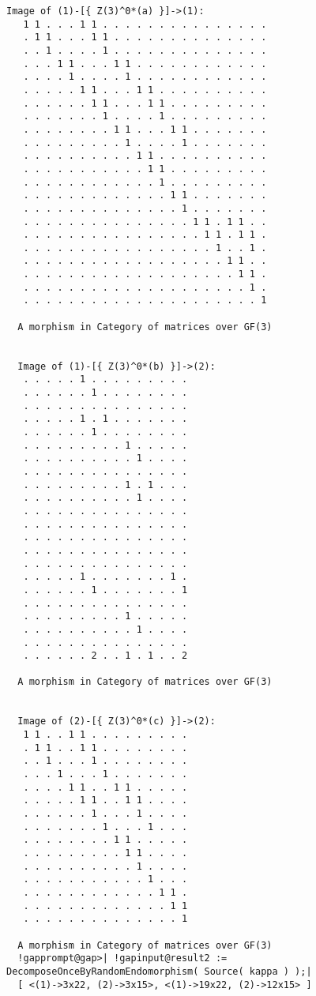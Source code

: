 \begin{computation}
\begin{Verbatim}[commandchars=!@|,fontsize=\small,frame=single,label=Example]
  Image of (1)-[{ Z(3)^0*(a) }]->(1):
   1 1 . . . 1 1 . . . . . . . . . . . . . . .
   . 1 1 . . . 1 1 . . . . . . . . . . . . . .
   . . 1 . . . . 1 . . . . . . . . . . . . . .
   . . . 1 1 . . . 1 1 . . . . . . . . . . . .
   . . . . 1 . . . . 1 . . . . . . . . . . . .
   . . . . . 1 1 . . . 1 1 . . . . . . . . . .
   . . . . . . 1 1 . . . 1 1 . . . . . . . . .
   . . . . . . . 1 . . . . 1 . . . . . . . . .
   . . . . . . . . 1 1 . . . 1 1 . . . . . . .
   . . . . . . . . . 1 . . . . 1 . . . . . . .
   . . . . . . . . . . 1 1 . . . . . . . . . .
   . . . . . . . . . . . 1 1 . . . . . . . . .
   . . . . . . . . . . . . 1 . . . . . . . . .
   . . . . . . . . . . . . . 1 1 . . . . . . .
   . . . . . . . . . . . . . . 1 . . . . . . .
   . . . . . . . . . . . . . . . 1 1 . 1 1 . .
   . . . . . . . . . . . . . . . . 1 1 . 1 1 .
   . . . . . . . . . . . . . . . . . 1 . . 1 .
   . . . . . . . . . . . . . . . . . . 1 1 . .
   . . . . . . . . . . . . . . . . . . . 1 1 .
   . . . . . . . . . . . . . . . . . . . . 1 .
   . . . . . . . . . . . . . . . . . . . . . 1
   
  A morphism in Category of matrices over GF(3)
   
   
  Image of (1)-[{ Z(3)^0*(b) }]->(2):
   . . . . . 1 . . . . . . . . .
   . . . . . . 1 . . . . . . . .
   . . . . . . . . . . . . . . .
   . . . . . 1 . 1 . . . . . . .
   . . . . . . 1 . . . . . . . .
   . . . . . . . . . 1 . . . . .
   . . . . . . . . . . 1 . . . .
   . . . . . . . . . . . . . . .
   . . . . . . . . . 1 . 1 . . .
   . . . . . . . . . . 1 . . . .
   . . . . . . . . . . . . . . .
   . . . . . . . . . . . . . . .
   . . . . . . . . . . . . . . .
   . . . . . . . . . . . . . . .
   . . . . . . . . . . . . . . .
   . . . . . 1 . . . . . . . 1 .
   . . . . . . 1 . . . . . . . 1
   . . . . . . . . . . . . . . .
   . . . . . . . . . 1 . . . . .
   . . . . . . . . . . 1 . . . .
   . . . . . . . . . . . . . . .
   . . . . . . 2 . . 1 . 1 . . 2
  
  A morphism in Category of matrices over GF(3)
 
 
  Image of (2)-[{ Z(3)^0*(c) }]->(2):
   1 1 . . 1 1 . . . . . . . . .
   . 1 1 . . 1 1 . . . . . . . .
   . . 1 . . . 1 . . . . . . . .
   . . . 1 . . . 1 . . . . . . .
   . . . . 1 1 . . 1 1 . . . . .
   . . . . . 1 1 . . 1 1 . . . .
   . . . . . . 1 . . . 1 . . . .
   . . . . . . . 1 . . . 1 . . .
   . . . . . . . . 1 1 . . . . .
   . . . . . . . . . 1 1 . . . .
   . . . . . . . . . . 1 . . . .
   . . . . . . . . . . . 1 . . .
   . . . . . . . . . . . . 1 1 .
   . . . . . . . . . . . . . 1 1
   . . . . . . . . . . . . . . 1
  
  A morphism in Category of matrices over GF(3)
  !gapprompt@gap>| !gapinput@result2 := DecomposeOnceByRandomEndomorphism( Source( kappa ) );|
  [ <(1)->3x22, (2)->3x15>, <(1)->19x22, (2)->12x15> ]
\end{Verbatim}

\end{computation}

